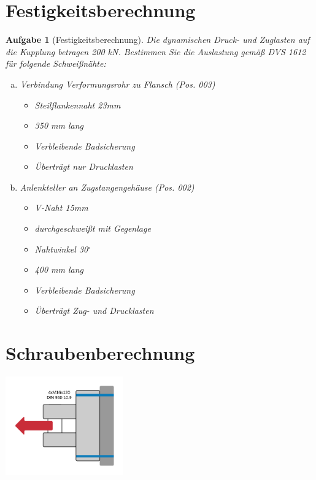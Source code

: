 \documentclass[11pt,a4paper,headsepline]{scrartcl}
\newtheorem{aufgabe}{Aufgabe}
\begin{document}
\section*{Festigkeitsberechnung}
\begin{aufgabe}[Festigkeitsberechnung] 
Die dynamischen Druck- und Zuglasten auf die Kupplung betragen 200 kN. Bestimmen Sie die Auslastung gem\"a{\ss} DVS 1612 f\"ur folgende Schwei{\ss}n\"ahte:
 \begin{enumerate}[a)]
\item Verbindung Verformungsrohr zu Flansch (Pos. 003)
\begin{itemize}
		\item Steilflankennaht 23mm
		\item 350 mm lang
		\item Verbleibende Badsicherung
		\item \"Ubertr\"agt nur Drucklasten
\end{itemize}
\item Anlenkteller an Zugstangengeh\"ause (Pos. 002)
\begin{itemize}
		\item V-Naht 15mm
		\item durchgeschwei{\ss}t mit Gegenlage
		\item Nahtwinkel 30$^\circ$
		\item 400 mm lang
		\item Verbleibende Badsicherung
		\item \"Ubertr\"agt Zug- und Drucklasten
\end{itemize}

\end{enumerate}
\end{aufgabe}
\newpage
\section*{Schraubenberechnung}

\begin{center}
            		\includegraphics[width=0.38\textwidth]{KonsoleKupplung}
		
        		\end{center}
\end{document}
